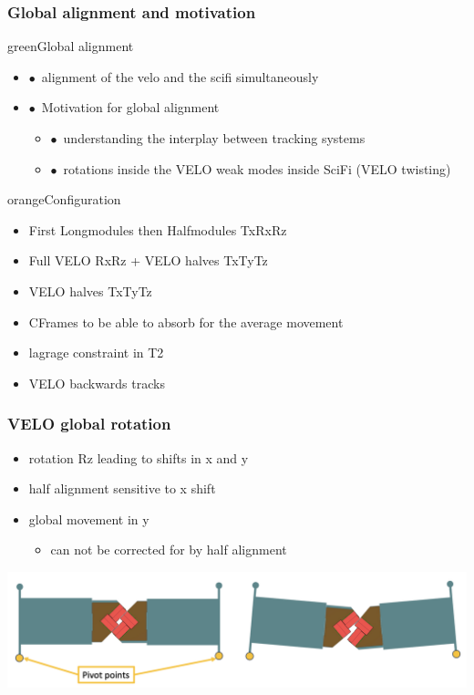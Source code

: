 \documentclass[aspectratio=1610, 12pt, xcolor=dvipsnames]{beamer}
\begin{document}
\begin{frame}\frametitle{Global alignment and motivation}
  \begin{mybox}{green}{Global alignment}
    \begin{itemize}
      \item $\bullet$\, alignment of the velo and the scifi simultaneously
    \end{itemize}
    \begin{itemize}
      \setlength\itemsep{0em}
      \item $\bullet$\, Motivation for global alignment
      \begin{itemize}
        \item $\bullet$\, understanding the interplay between tracking systems
        \item $\bullet$\, rotations inside the VELO \to weak modes inside SciFi (VELO twisting)
      \end{itemize}
    \end{itemize}
  \end{mybox}
  \begin{mybox}{orange}{Configuration}
    \begin{itemize}
      \item First Longmodules then Halfmodules TxRxRz
      \item Full VELO RxRz + VELO halves TxTyTz
      \item VELO halves TxTyTz
      \item CFrames to be able to absorb for the average movement
      \item lagrage constraint in T2
      \item VELO backwards tracks
    \end{itemize}
  \end{mybox}
\end{frame}

\begin{frame}\frametitle{VELO global rotation}
  \begin{itemize}
    \item rotation Rz leading to shifts in x and y
    \item half alignment sensitive to x shift 
    \item global movement in y
    \begin{itemize}
      \item can not be corrected for by half alignment
    \end{itemize}
  \end{itemize}
  \includegraphics[width=\textwidth]{plots/velo_rotation.png}
\end{frame}
\end{document}
